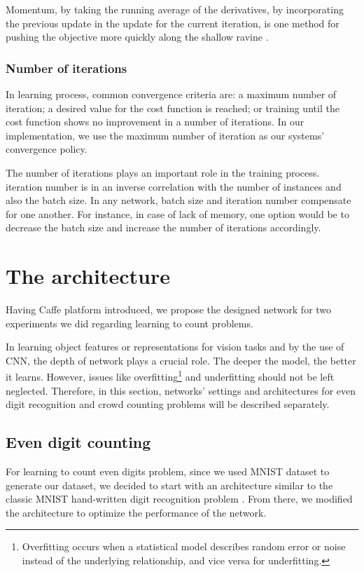 Momentum, by taking the running average of the derivatives, by incorporating the previous update in the update for the current iteration, is one method for pushing the objective more quickly along the shallow ravine \cite{sgd}. 

\subsubsection{Number of iterations}

In learning process, common convergence criteria are: a maximum number of iteration; a desired value for the cost function is reached; or training until the cost function shows no improvement in a number of iterations. In our implementation, we use the maximum number of iteration as our systems' convergence policy. 
 
The number of iterations plays an important role in the training process. iteration number is in an inverse correlation with the number of instances and also the batch size. In any network, batch size and iteration number compensate for one another. For instance, in case of lack of memory, one option would be to decrease the batch size and increase the number of iterations accordingly.


\section{The architecture}
\label{imparch}
Having Caffe platform introduced, we propose the designed network for two experiments we did regarding learning to count problems.

In learning object features or representations for vision tasks and by the use of CNN, the depth of network plays a crucial role. The deeper the model, the better it learns. However, issues like overfitting\footnote{Overfitting occurs when a statistical model describes random error or noise instead of the underlying relationship, and vice versa for underfitting. } and underfitting should not be left neglected.   
Therefore, in this section, networks' settings and architectures for even digit recognition and crowd counting problems will be described separately. 

\subsection{Even digit counting}
\label{subsubsec:digitarch}
For learning to count even digits problem, since we used MNIST dataset to generate our dataset, we decided to start with an architecture similar to the classic MNIST hand-written digit recognition problem \cite{lecun1995comparison}. From there, we modified the architecture to optimize the performance of the network.

